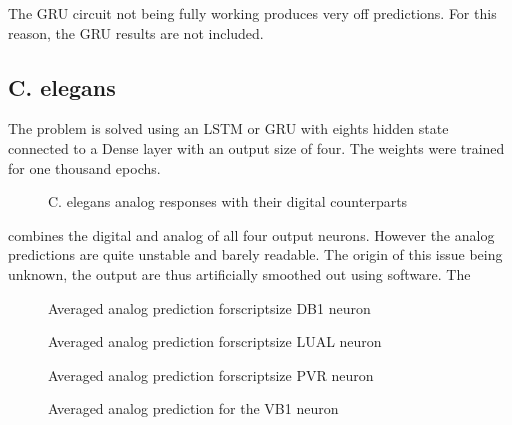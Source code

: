 The GRU circuit not being fully working produces very off predictions. For this reason, the GRU results are not included.

\subsection{C. elegans}

The problem is solved using an LSTM or GRU with eights hidden state connected to a Dense layer with an output size of four. The weights were trained for one thousand epochs.

\begin{figure}[h]
  \centering
  
  \caption{\acs{C. elegans} analog responses with their digital counterparts}
  \label{graph:celegansAnalog0}
\end{figure}

 combines the digital and analog of all four output neurons. However the analog predictions are quite unstable and barely readable. The origin of this issue being unknown, the output are thus artificially smoothed out using software. The

\begin{figure}[h]
  \centering
  
  \caption{Averaged analog prediction forscriptsize DB1 neuron\label{graph:smooth5BD1Celegans}}
\end{figure}
\begin{figure}[h]
  \centering
  
  \caption{Averaged analog prediction forscriptsize LUAL neuron\label{graph:smooth5LUALCelegans}}
\end{figure}
\begin{figure}[h]
  
  \caption{Averaged analog prediction forscriptsize PVR neuron\label{graph:smooth5PVRCelegans}}
\end{figure}
\begin{figure}[h]
  
  \caption{Averaged analog prediction for the VB1 neuron\label{graph:smooth5VB1Celegans}}
\end{figure}

